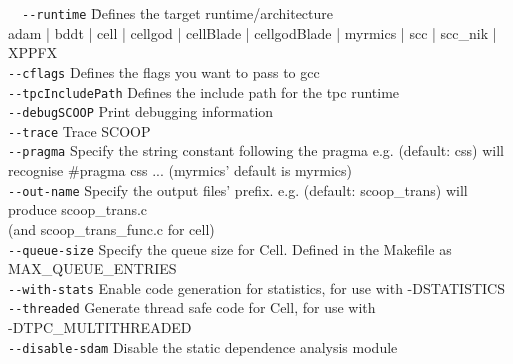 \documentclass[a4paper]{article}
\begin{document}
  \begin{tabbing}
  \ \ \=\verb!--runtime!\hspace{9em} \=
  Defines the target runtime/architecture\\
                                    \>\>adam | bddt | cell | cellgod | cellBlade | cellgodBlade | myrmics | scc | scc_nik | XPPFX\\[1ex]
  \>\verb!--cflags!                   \>Defines the flags you want to pass to gcc\\[1ex]
  \>\verb!--tpcIncludePath!           \>Defines the include path for the tpc runtime\\[1ex]
  \>\verb!--debugSCOOP!               \>Print debugging information\\[1ex]
  \>\verb!--trace!                    \>Trace SCOOP\\[1ex]
  \>\verb!--pragma!                   \>Specify the string constant following the pragma e.g. (default: css) will recognise \#pragma css ... (myrmics' default is myrmics)\\[1ex]
  \>\verb!--out-name!                 \>Specify the output files' prefix. e.g. (default: scoop\_trans) will produce scoop\_trans.c\\
                                    \>\>(and scoop\_trans\_func.c for cell)\\[1ex]
  \>\verb!--queue-size!               \>Specify the queue size for Cell. Defined in the Makefile as\\
                                    \>\>MAX\_QUEUE\_ENTRIES\\[1ex]
  \>\verb!--with-stats!               \>Enable code generation for statistics, for use with -DSTATISTICS\\[1ex]
  \>\verb!--threaded!                 \>Generate thread safe code for Cell, for use with\\
                                    \>\>-DTPC\_MULTITHREADED\\[1ex]
  \>\verb!--disable-sdam!             \>Disable the static dependence analysis module
  \end{tabbing}
\end{document}
